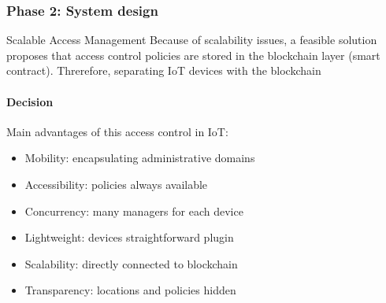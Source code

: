 \documentclass[
    aspectratio=169,                   %
]{beamer}
\begin{document}
    \begin{frame}
        \frametitle{Phase 2: System design}
        
        \begin{block}{Scalable Access Management}
            Because of scalability issues, a feasible solution proposes that access control policies are stored in the blockchain layer (smart contract). Threrefore, separating IoT devices with the blockchain\cite{novo}
        \end{block}

        \paragraph{Decision} Main advantages of this access control in IoT:

        \begin{itemize}
            \item \alert{Mobility}: encapsulating administrative domains
            \item \alert{Accessibility}: policies always available
            \item \alert{Concurrency}: many managers for each device
            \item \alert{Lightweight}: devices straightforward plugin
            \item \alert{Scalability}: directly connected to blockchain
            \item \alert{Transparency}: locations and policies hidden
        \end{itemize}
    \end{frame}
\end{document}

